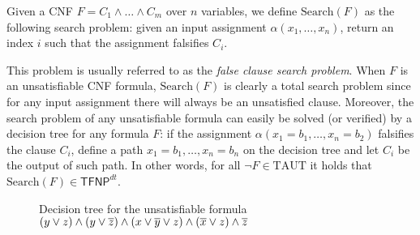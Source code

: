 \begin{definition}
    Given a CNF $F = C_1 \land \ldots \land C_m$ over $n$ variables, we define $\mathrm{Search}(F)$ as the following search problem: given an input assignment $\alpha(x_1, \ldots, x_n)$, return an index $i$ such that the assignment falsifies $C_i$.
\end{definition}

This problem is usually referred to as the \textit{false clause search problem}. 
When $F$ is an unsatisfiable CNF formula, $\mathrm{Search}(F)$ is clearly a total search problem since for any input assignment there will always be an unsatisfied clause. Moreover, the search problem of any unsatisfiable formula can easily be solved (or verified) by a decision tree for any formula $F$: if the assignment $\alpha(x_1 = b_1, \ldots, x_n = b_2)$ falsifies the clause $C_i$, define a path $x_1 = b_1, \ldots, x_n = b_n$ on the decision tree and let $C_i$ be the output of such path. In other words, for all $\lnot F \in \mathrm{TAUT}$ it holds that $\mathrm{Search}(F) \in \mathsf{TFNP}^{dt}$. 

\begin{figure}[H]
    \centering
    
    
    \caption{Decision tree for the unsatisfiable formula $(y \lor z) \land (y \lor \overline{z}) \land (x \lor \overline{y} \lor z) \land (\overline{x} \lor z) \land \overline{z}$}
    \end{figure}


